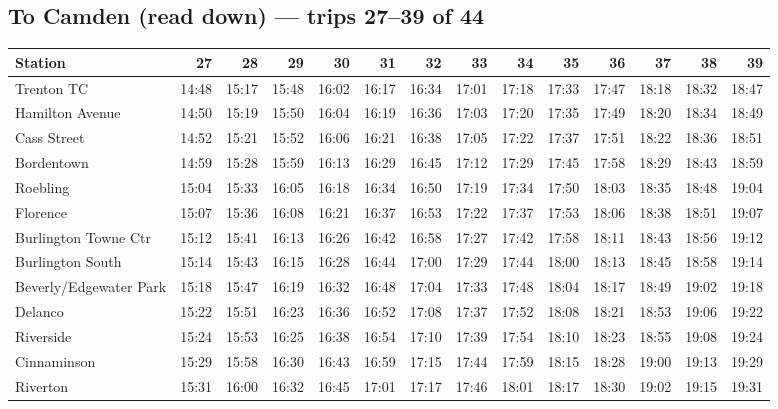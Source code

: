 \subsection*{To Camden (read down) --- trips 27--39 of 44}
\begin{center}\footnotesize\setlength{\tabcolsep}{3pt}\begin{tabular}{@{}lrrrrrrrrrrrrr@{}}\toprule
Station & 27 & 28 & 29 & 30 & 31 & 32 & 33 & 34 & 35 & 36 & 37 & 38 & 39 \\\midrule
Trenton TC & 14:48 & 15:17 & 15:48 & 16:02 & 16:17 & 16:34 & 17:01 & 17:18 & 17:33 & 17:47 & 18:18 & 18:32 & 18:47 \\
Hamilton Avenue & 14:50 & 15:19 & 15:50 & 16:04 & 16:19 & 16:36 & 17:03 & 17:20 & 17:35 & 17:49 & 18:20 & 18:34 & 18:49 \\
Cass Street & 14:52 & 15:21 & 15:52 & 16:06 & 16:21 & 16:38 & 17:05 & 17:22 & 17:37 & 17:51 & 18:22 & 18:36 & 18:51 \\
Bordentown & 14:59 & 15:28 & 15:59 & 16:13 & 16:29 & 16:45 & 17:12 & 17:29 & 17:45 & 17:58 & 18:29 & 18:43 & 18:59 \\
Roebling & 15:04 & 15:33 & 16:05 & 16:18 & 16:34 & 16:50 & 17:19 & 17:34 & 17:50 & 18:03 & 18:35 & 18:48 & 19:04 \\
Florence & 15:07 & 15:36 & 16:08 & 16:21 & 16:37 & 16:53 & 17:22 & 17:37 & 17:53 & 18:06 & 18:38 & 18:51 & 19:07 \\
Burlington Towne Ctr & 15:12 & 15:41 & 16:13 & 16:26 & 16:42 & 16:58 & 17:27 & 17:42 & 17:58 & 18:11 & 18:43 & 18:56 & 19:12 \\
Burlington South & 15:14 & 15:43 & 16:15 & 16:28 & 16:44 & 17:00 & 17:29 & 17:44 & 18:00 & 18:13 & 18:45 & 18:58 & 19:14 \\
Beverly/Edgewater Park & 15:18 & 15:47 & 16:19 & 16:32 & 16:48 & 17:04 & 17:33 & 17:48 & 18:04 & 18:17 & 18:49 & 19:02 & 19:18 \\
Delanco & 15:22 & 15:51 & 16:23 & 16:36 & 16:52 & 17:08 & 17:37 & 17:52 & 18:08 & 18:21 & 18:53 & 19:06 & 19:22 \\
Riverside & 15:24 & 15:53 & 16:25 & 16:38 & 16:54 & 17:10 & 17:39 & 17:54 & 18:10 & 18:23 & 18:55 & 19:08 & 19:24 \\
Cinnaminson & 15:29 & 15:58 & 16:30 & 16:43 & 16:59 & 17:15 & 17:44 & 17:59 & 18:15 & 18:28 & 19:00 & 19:13 & 19:29 \\
Riverton & 15:31 & 16:00 & 16:32 & 16:45 & 17:01 & 17:17 & 17:46 & 18:01 & 18:17 & 18:30 & 19:02 & 19:15 & 19:31 \\

\end{tabular}
\end{center}
